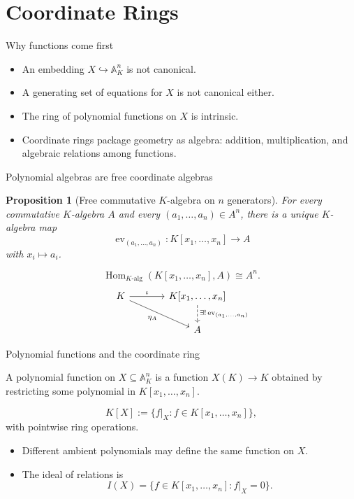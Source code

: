 \documentclass[10pt, aspectratio=169]{beamer}
\DeclareMathOperator{\Hom}{Hom}
\newcommand{\A}{\mathbb{A}}
\newtheorem{proposition}[theorem]{Proposition}
\begin{document}
\section{Coordinate Rings}

\begin{frame}{Why functions come first}
    \begin{itemize}
        \item An embedding $X \hookrightarrow \A_K^n$ is not canonical.
        \item A generating set of equations for $X$ is not canonical either.
        \item The ring of polynomial functions on $X$ is intrinsic.
        \item Coordinate rings package geometry as algebra: addition, multiplication, and algebraic relations among functions.
    \end{itemize}
\end{frame}

\begin{frame}[fragile]{Polynomial algebras are free coordinate algebras}
    \begin{proposition}[Free commutative $K$-algebra on $n$ generators]
        For every commutative $K$-algebra $A$ and every $(a_1,\dots,a_n) \in A^n$, there is a unique $K$-algebra map
        \[
        \operatorname{ev}_{(a_1,\dots,a_n)} : K[x_1,\dots,x_n] \longrightarrow A
        \]
        with $x_i \mapsto a_i$.
    \end{proposition}
    \[
    \boxed{\Hom_{K\text{-alg}}(K[x_1,\dots,x_n], A) \cong A^n.}
    \]
    \vspace{-0.3em}
    \[
    \begin{tikzcd}[column sep=large]
        K \arrow[r, "\iota"] \arrow[dr, "\eta_A"'] & K[x_1,\dots,x_n] \arrow[d, dashed, "\exists!\,\mathrm{ev}_{(a_1,\dots,a_n)}"] \\
        & A
    \end{tikzcd}
    \]
\end{frame}

\begin{frame}{Polynomial functions and the coordinate ring}
    \begin{definition}
        A polynomial function on $X \subseteq \A_K^n$ is a function $X(K) \to K$ obtained by restricting some polynomial in $K[x_1,\dots,x_n]$.
    \end{definition}
    \begin{definition}
        \[
        K[X] := \{f|_X : f \in K[x_1,\dots,x_n]\},
        \]
        with pointwise ring operations.
    \end{definition}
    \begin{itemize}
        \item Different ambient polynomials may define the same function on $X$.
        \item The ideal of relations is
        \[
        I(X) = \{f \in K[x_1,\dots,x_n] : f|_X = 0\}.
        \]
    \end{itemize}
\end{frame}
\end{document}
